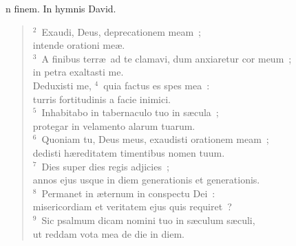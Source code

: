 \bchapter[Psalm]
n finem. In hymnis David.
\begin{verse}${}^{2}$~Exaudi, Deus, deprecationem meam~;\\ intende orationi me\ae .\\
${}^{3}$~A finibus terr\ae\ ad te clamavi, dum anxiaretur cor meum~;\\ in petra exaltasti me.\\ Deduxisti me,
${}^{4}$~quia factus es spes mea~:\\ turris fortitudinis a facie inimici.\\
${}^{5}$~Inhabitabo in tabernaculo tuo in s\ae cula~;\\ protegar in velamento alarum tuarum.\\
${}^{6}$~Quoniam tu, Deus meus, exaudisti orationem meam~;\\ dedisti h\ae reditatem timentibus nomen tuum.\\
${}^{7}$~Dies super dies regis adjicies~;\\ annos ejus usque in diem generationis et generationis.\\
${}^{8}$~Permanet in \ae ternum in conspectu Dei~:\\ misericordiam et veritatem ejus quis requiret~?\\
${}^{9}$~Sic psalmum dicam nomini tuo in s\ae culum s\ae culi,\\ ut reddam vota mea de die in diem.\end{verse}



